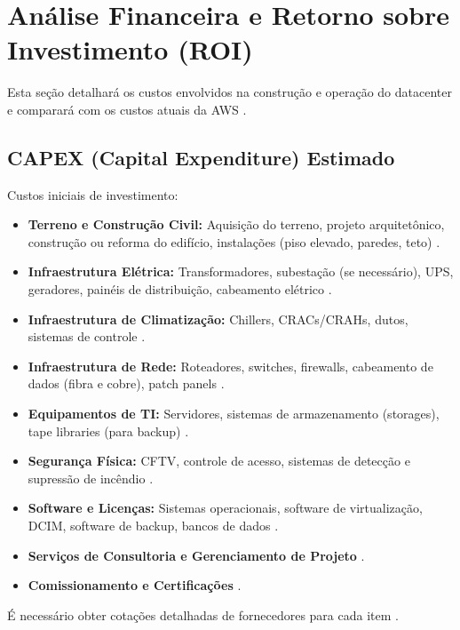 \documentclass[
	12pt,				%
	oneside,			%
	a4paper,			%
	english,			%
	brazil				%
	]{abntex2unama}
\begin{document}
\chapter{Análise Financeira e Retorno sobre Investimento (ROI)}
Esta seção detalhará os custos envolvidos na construção e operação do datacenter e comparará com os custos atuais da AWS \cite{capacity_planning}.
\section{CAPEX (Capital Expenditure) Estimado}
Custos iniciais de investimento:
\begin{itemize}
	\item \textbf{Terreno e Construção Civil:} Aquisição do terreno, projeto arquitetônico, construção ou reforma do edifício, instalações (piso elevado, paredes, teto) \cite{design_principles}.
	\item \textbf{Infraestrutura Elétrica:} Transformadores, subestação (se necessário), UPS, geradores, painéis de distribuição, cabeamento elétrico \cite{power_distribution}.
	\item \textbf{Infraestrutura de Climatização:} Chillers, CRACs/CRAHs, dutos, sistemas de controle \cite{cooling_technologies}.
	\item \textbf{Infraestrutura de Rede:} Roteadores, switches, firewalls, cabeamento de dados (fibra e cobre), patch panels \cite{datacenter_networking}.
	\item \textbf{Equipamentos de TI:} Servidores, sistemas de armazenamento (storages), tape libraries (para backup) \cite{cloud_infrastructure}.
	\item \textbf{Segurança Física:} CFTV, controle de acesso, sistemas de detecção e supressão de incêndio \cite{datacenter_security}.
	\item \textbf{Software e Licenças:} Sistemas operacionais, software de virtualização, DCIM, software de backup, bancos de dados \cite{dcim_systems}.
	\item \textbf{Serviços de Consultoria e Gerenciamento de Projeto} \cite{reliability_engineering}.
	\item \textbf{Comissionamento e Certificações} \cite{energy_efficiency}.
\end{itemize}
É necessário obter cotações detalhadas de fornecedores para cada item \cite{hyperscale_datacenters}.
\end{document}
